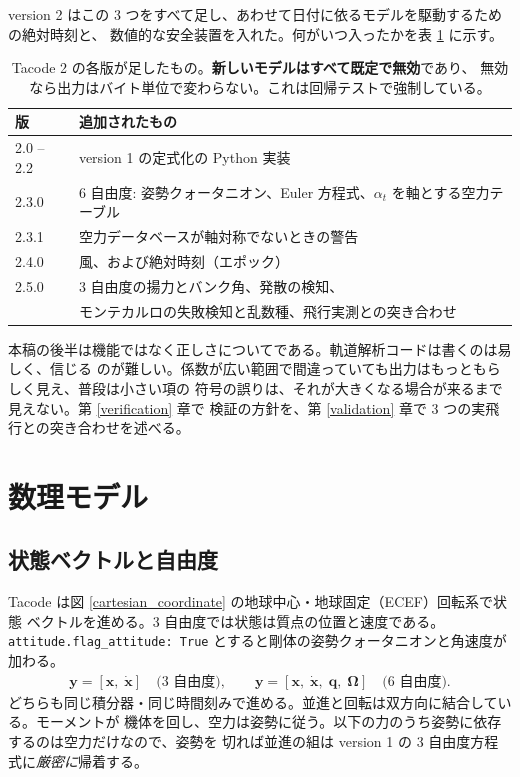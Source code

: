 \documentclass[11pt,a4paper,dvipdfmx]{jsarticle}
\newcommand{\bx}{{\boldsymbol x}}
\newcommand{\bq}{{\boldsymbol q}}
\newcommand{\bOm}{{\boldsymbol \Omega}}
\begin{document}
version 2 はこの 3 つをすべて足し、あわせて日付に依るモデルを駆動するための絶対時刻と、
数値的な安全装置を入れた。何がいつ入ったかを表 \ref{version_history} に示す。

\begin{table}[h]
\caption{Tacode 2 の各版が足したもの。\textbf{新しいモデルはすべて既定で無効}であり、
無効なら出力はバイト単位で変わらない。これは回帰テストで強制している。}
\label{version_history}
\begin{center}
\small
\begin{tabular}{l|l}
\hline \hline
版 & 追加されたもの \\
\hline
2.0 -- 2.2 & version 1 の定式化の Python 実装 \\
2.3.0 & 6 自由度: 姿勢クォータニオン、Euler 方程式、$\alpha_t$ を軸とする空力テーブル \\
2.3.1 & 空力データベースが軸対称でないときの警告 \\
2.4.0 & 風、および絶対時刻（エポック） \\
2.5.0 & 3 自由度の揚力とバンク角、発散の検知、 \\
      & モンテカルロの失敗検知と乱数種、飛行実測との突き合わせ \\
\hline \hline
\end{tabular}
\end{center}
\end{table}

本稿の後半は機能ではなく正しさについてである。軌道解析コードは書くのは易しく、信じる
のが難しい。係数が広い範囲で間違っていても出力はもっともらしく見え、普段は小さい項の
符号の誤りは、それが大きくなる場合が来るまで見えない。第 \ref{verification} 章で
検証の方針を、第 \ref{validation} 章で 3 つの実飛行との突き合わせを述べる。

\section{数理モデル}

\subsection{状態ベクトルと自由度}

Tacode は図 \ref{cartesian_coordinate} の地球中心・地球固定（ECEF）回転系で状態
ベクトルを進める。3 自由度では状態は質点の位置と速度である。
\texttt{attitude.flag\_attitude: True} とすると剛体の姿勢クォータニオンと角速度が加わる。
%
\begin{align}
	{\boldsymbol y} = \left[ \bx, \; \dot{\bx} \right] \quad \textrm{(3 自由度)} ,
	\qquad
	{\boldsymbol y} = \left[ \bx, \; \dot{\bx}, \; \bq, \; \bOm \right] \quad \textrm{(6 自由度)} .
\end{align}
%
どちらも同じ積分器・同じ時間刻みで進める。並進と回転は双方向に結合している。モーメントが
機体を回し、空力は姿勢に従う。以下の力のうち姿勢に依存するのは空力だけなので、姿勢を
切れば並進の組は version 1 の 3 自由度方程式に\emph{厳密に}帰着する。
\end{document}

